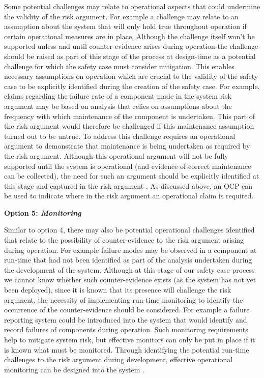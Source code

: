Some potential challenges may relate to operational aspects that could undermine the validity of the risk argument. For example a challenge may relate to an assumption about the system that will only hold true throughout operation if certain operational measures are in place. Although the challenge itself won't be supported unless and until counter-evidence arises during operation the challenge should be raised as part of this stage of the process at design-time as a potential challenge for which the safety case must consider mitigation. This enables necessary assumptions on operation which are crucial to the validity of the safety case to be explicitly identified during the creation of the safety case. For example, claims regarding the failure rate of a component made in the system risk argument may be based on analysis that relies on assumptions about the frequency with which maintenance of the component is undertaken. This part of the risk argument would therefore be challenged if this maintenance assumption turned out to be untrue. To address this challenge requires an operational argument to demonstrate that maintenance is being undertaken as required by the risk argument. Although this operational argument will not be fully supported until the system is operational (and evidence of correct maintenance can be collected), the need for such an argument should be explicitly identified at this stage and captured in the risk argument \cite{fenn2024new}. As discussed above, an OCP can be used to indicate where in the risk argument an operational claim is required.


\textbf{Option 5: \textit{Monitoring}} 

Similar to option 4, there may also be potential operational challenges identified that relate to the possibility of counter-evidence to the risk argument arising during operation. For example failure modes may be observed in a component at run-time that had not been identified as part of the analysis undertaken during the development of the system. Although at this stage of our safety case process we cannot know whether such counter-evidence exists (as the system has not yet been deployed), since it is known that its presence will challenge the risk argument, the necessity of implementing run-time monitoring to identify the occurrence of the counter-evidence should be considered. For example a failure reporting system could be introduced into the system that would identify and record failures of components during operation. Such monitoring requirements help to mitigate system risk, but effective monitors can only be put in place if it is known what must be monitored. Through identifying the potential run-time challenges to the risk argument during development, effective operational monitoring can be designed into the system \cite{hawkins2023identifying}.

